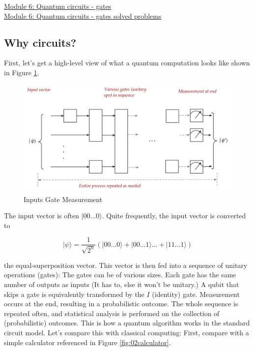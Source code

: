 \documentclass[main.tex]{subfiles}
\begin{document}
\href{https://www2.seas.gwu.edu/~simhaweb/quantum/modules/module6/module6.html}{Module 6: Quantum circuits - gates}\\
\href{https://www2.seas.gwu.edu/~simhaweb/quantum/modules/module6/problems6.html}{Module 6: Quantum circuits - gates solved problems}

\subsection{Why circuits?}

    First, let's get a high-level view of what a quantum computation looks like shown in Figure \ref{fig:01circuit}.

    \begin{figure}
        \centering
        \includegraphics[width=5in]{notes/figs/n08/01circuit.png}
        \caption{Inputs Gate Measurement}
        \label{fig:01circuit}
    \end{figure}
    
    The input vector is often $|00 \ldots 0\rangle$. Quite frequently, the input vector is converted to
    
    $$
    |\psi\rangle=\frac{1}{\sqrt{2^{n}}}(|00 \ldots 0\rangle+|00 \ldots 1\rangle \ldots+|11 \ldots 1\rangle)
    $$
    
    the equal-superposition vector. This vector is then fed into a sequence of unitary operations (gates): The gates can be of various sizes. Each gate has the same number of outputs as inputs (It has to, else it won't be unitary.) A qubit that skips a gate is equivalently transformed by the $I$ (identity) gate. Measurement occurs at the end, resulting in a probabilistic outcome. The whole sequence is repeated often, and statistical analysis is performed on the collection of (probabilistic) outcomes. This is how a quantum algorithm works in the standard circuit model. Let's compare this with classical computing: First, compare with a simple calculator referenced in Figure \ref{fig:02calculator}.
    
\end{document}
